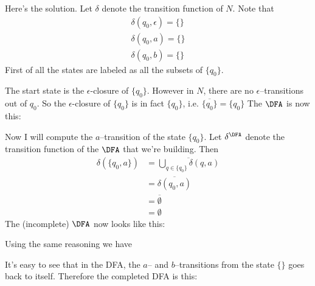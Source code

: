 Here's the solution.
Let $\delta$ denote the transition function of $N$.
Note that 
\begin{align*}
  \delta(q_0, \epsilon) = \{\} \\
  \delta(q_0, a) = \{\} \\
  \delta(q_0, b) = \{\} 
\end{align*}
First of all the states are labeled as all the subsets of $\{q_0\}$.



The start state is the $\epsilon$-closure of $\{q_0\}$.
However in $N$, there are no $\epsilon$--transitions out of 
$q_0$.
So the $\epsilon$-closure of $\{q_0\}$ is in fact $\{q_0\}$, i.e.
$\overline{\{q_0\}} = \{q_0\}$
The $\DFA$ is now this:



Now I will compute the $a$--transition of the state $\{q_0\}$.
Let $\delta^\DFA$ denote the transition function of the $\DFA$
that we're building.
Then
\begin{align*}
\delta( \{q_0, a\} ) 
&= \overline{ \bigcup_{q \in \{q_0\}} \delta(q, a)} \\
&= \overline{ \delta(q_0, a) } \\
&= \overline{ \emptyset } \\
&= \emptyset
\end{align*}
The (incomplete) $\DFA$ now looks like this:



Using the same reasoning we have



It's easy to see that in the DFA, the $a$--
and $b$--transitions from the state $\{\}$ goes back to itself.
Therefore the completed DFA is this:


